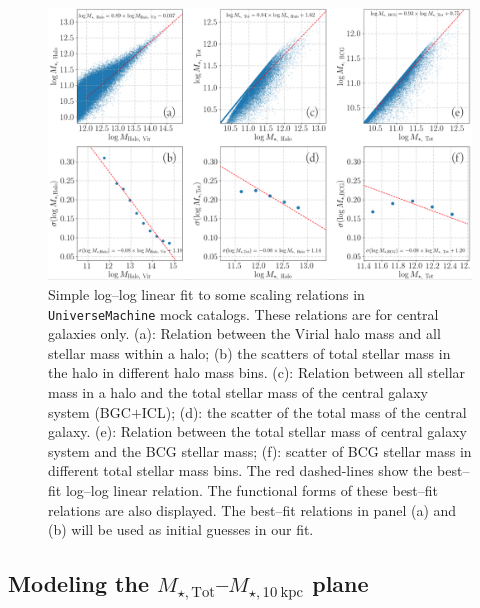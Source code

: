 \documentclass[a4paper,fleqn,usenatbib]{mnras}
\def\mtot{{$M_{\star,\mathrm{Tot}}$}}
\def\minn{{$M_{\star,10\ \mathrm{kpc}}$}}
\def\um{\texttt{UniverseMachine}}
\begin{document}
    \begin{figure}
        \centering 
        \includegraphics[width=\textwidth]{fig/um2_relation_initial}
            \caption{
                Simple log--log linear fit to some scaling relations in 
                \um{} mock catalogs.  
                These relations are for central galaxies only.  
                (a): Relation between the Virial halo mass and all stellar mass within 
                a halo; 
                (b) the scatters of total stellar mass in the halo in different halo 
                mass bins.  
                (c): Relation between all stellar mass in a halo and the total stellar 
                mass of the central galaxy system (BGC$+$ICL); 
                (d): the scatter of the total mass of the central galaxy.  
                (e): Relation between the total stellar mass of central galaxy system 
                and the BCG stellar mass; 
                (f): scatter of BCG stellar mass in different total stellar mass bins.   
                The red dashed-lines show the best--fit log--log linear relation.  
                The functional forms of these best--fit relations are also displayed.  
                The best--fit relations in panel (a) and (b) will be used as initial 
                guesses in our fit.
                }
        \label{fig:um2_stellar}
    \end{figure}

\subsection{Modeling the \mtot{}--\minn{} plane}
    \label{ssec:m100_m10}
    
\end{document}
